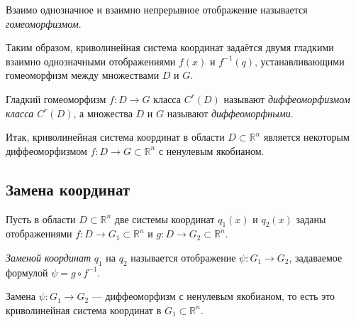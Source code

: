 \begin{definition}
  Взаимо однозначное и взаимно непрерывное отображение называется
  \textit{гомеоморфизмом}.
\end{definition}

Таким образом, криволинейная система координат задаётся двумя гладкими взаимно
однозначными отображениями $f(x)$ и $f^{-1}(q)$, устанавливающими гомеоморфизм
между множествами $D$ и $G$.

\begin{definition}
  Гладкий гомеоморфизм $f : D \to G$ класса $C^r(D)$ называют
  \textit{диффеоморфизмом класса $C^r(D)$}, а множества $D$ и $G$ называют
  \textit{диффеоморфными}.
\end{definition}

Итак, криволинейная система координат в области $D \subset \mathbb{R}^n$
является некоторым диффеоморфизмом $f : D \to G \subset \mathbb{R}^n$ с
ненулевым якобианом.

\subsection{Замена координат}

Пусть в области $D \subset \mathbb{R}^n$ две системы координат $q_1(x)$ и
$q_2(x)$ заданы отображениями $f : D \to G_1 \subset \mathbb{R}^n$ и
$g : D \to G_2 \subset \mathbb{R}^n$.

\begin{definition}
  \textit{Заменой координат} $q_1$ на $q_2$ называется отображение
  $\psi : G_1 \to G_2$, задаваемое формулой $\psi = g \circ f^{-1}$.
\end{definition}

\begin{remark}
  Замена $\psi : G_1 \to G_2$ --- диффеоморфизм с ненулевым якобианом, то есть
  это криволинейная система координат в $G_1 \subset \mathbb{R}^n$.
\end{remark}

